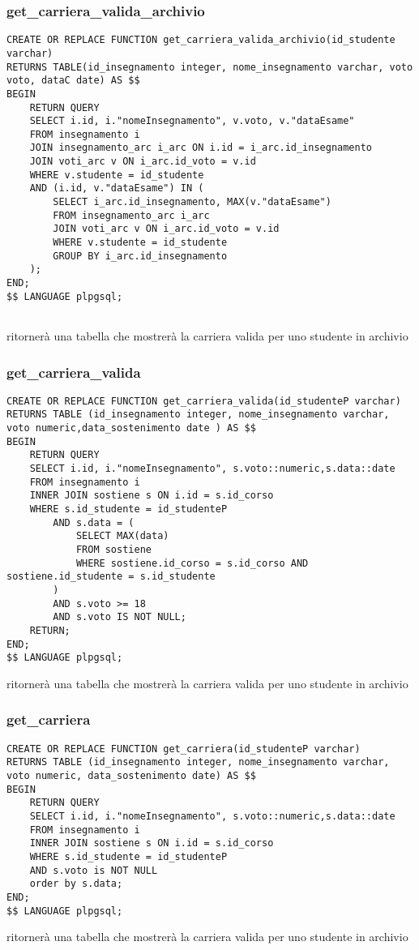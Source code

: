 \subsubsection{get\_carriera\_valida\_archivio}
\begin{lstlisting}[style=sqlStyle]
CREATE OR REPLACE FUNCTION get_carriera_valida_archivio(id_studente varchar)
RETURNS TABLE(id_insegnamento integer, nome_insegnamento varchar, voto voto, dataC date) AS $$
BEGIN
    RETURN QUERY
    SELECT i.id, i."nomeInsegnamento", v.voto, v."dataEsame"
    FROM insegnamento i
    JOIN insegnamento_arc i_arc ON i.id = i_arc.id_insegnamento
    JOIN voti_arc v ON i_arc.id_voto = v.id
    WHERE v.studente = id_studente
    AND (i.id, v."dataEsame") IN (
        SELECT i_arc.id_insegnamento, MAX(v."dataEsame")
        FROM insegnamento_arc i_arc
        JOIN voti_arc v ON i_arc.id_voto = v.id
        WHERE v.studente = id_studente
        GROUP BY i_arc.id_insegnamento
    );
END;
$$ LANGUAGE plpgsql;


\end{lstlisting}
ritornerà una tabella che mostrerà la carriera valida per uno studente in archivio

\subsubsection{get\_carriera\_valida}\label{getCarrieraValida}
\begin{lstlisting}[style=sqlStyle]
CREATE OR REPLACE FUNCTION get_carriera_valida(id_studenteP varchar)
RETURNS TABLE (id_insegnamento integer, nome_insegnamento varchar, voto numeric,data_sostenimento date ) AS $$
BEGIN
    RETURN QUERY
    SELECT i.id, i."nomeInsegnamento", s.voto::numeric,s.data::date
    FROM insegnamento i 
    INNER JOIN sostiene s ON i.id = s.id_corso
    WHERE s.id_studente = id_studenteP
        AND s.data = (
            SELECT MAX(data)
            FROM sostiene
            WHERE sostiene.id_corso = s.id_corso AND sostiene.id_studente = s.id_studente
        )
        AND s.voto >= 18
        AND s.voto IS NOT NULL;
    RETURN;
END;
$$ LANGUAGE plpgsql;

\end{lstlisting}
ritornerà una tabella che mostrerà la carriera valida per uno studente in archivio
\subsubsection{get\_carriera}
\begin{lstlisting}[style=sqlStyle]
CREATE OR REPLACE FUNCTION get_carriera(id_studenteP varchar)
RETURNS TABLE (id_insegnamento integer, nome_insegnamento varchar, voto numeric, data_sostenimento date) AS $$
BEGIN
    RETURN QUERY
    SELECT i.id, i."nomeInsegnamento", s.voto::numeric,s.data::date
    FROM insegnamento i 
    INNER JOIN sostiene s ON i.id = s.id_corso
    WHERE s.id_studente = id_studenteP
    AND s.voto is NOT NULL
    order by s.data;
END;
$$ LANGUAGE plpgsql;
\end{lstlisting}
ritornerà una tabella che mostrerà la carriera valida per uno studente in archivio

